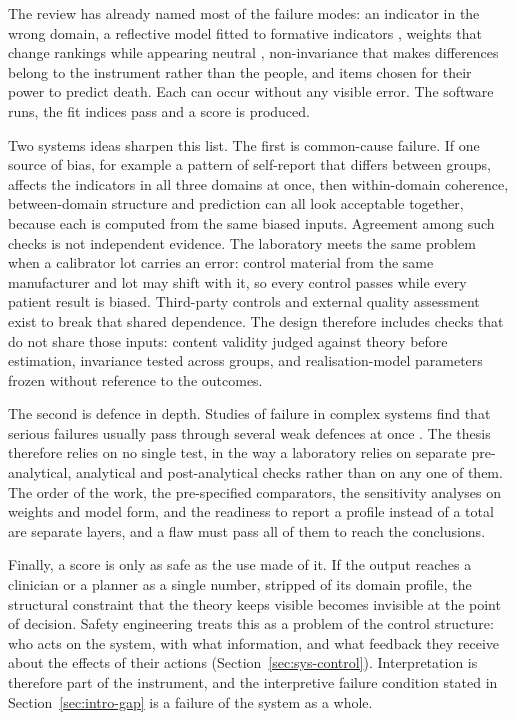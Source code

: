 The review has already named most of the failure modes: an indicator in the wrong domain, a reflective model fitted to formative indicators \citep{jarvis_2003}, weights that change rankings while appearing neutral \citep{greco_2019}, non-invariance that makes differences belong to the instrument rather than the people, and items chosen for their power to predict death. Each can occur without any visible error. The software runs, the fit indices pass and a score is produced.

Two systems ideas sharpen this list. The first is common-cause failure. If one source of bias, for example a pattern of self-report that differs between groups, affects the indicators in all three domains at once, then within-domain coherence, between-domain structure and prediction can all look acceptable together, because each is computed from the same biased inputs. Agreement among such checks is not independent evidence. The laboratory meets the same problem when a calibrator lot carries an error: control material from the same manufacturer and lot may shift with it, so every control passes while every patient result is biased. Third-party controls and external quality assessment exist to break that shared dependence. The design therefore includes checks that do not share those inputs: content validity judged against theory before estimation, invariance tested across groups, and realisation-model parameters frozen without reference to the outcomes.

The second is defence in depth. Studies of failure in complex systems find that serious failures usually pass through several weak defences at once \citep{reason_1990}. The thesis therefore relies on no single test, in the way a laboratory relies on separate pre-analytical, analytical and post-analytical checks rather than on any one of them. The order of the work, the pre-specified comparators, the sensitivity analyses on weights and model form, and the readiness to report a profile instead of a total are separate layers, and a flaw must pass all of them to reach the conclusions.

Finally, a score is only as safe as the use made of it. If the output reaches a clinician or a planner as a single number, stripped of its domain profile, the structural constraint that the theory keeps visible becomes invisible at the point of decision. Safety engineering treats this as a problem of the control structure: who acts on the system, with what information, and what feedback they receive about the effects of their actions \citep{leveson_2011} (Section~\ref{sec:sys-control}). Interpretation is therefore part of the instrument, and the interpretive failure condition stated in Section~\ref{sec:intro-gap} is a failure of the system as a whole.

